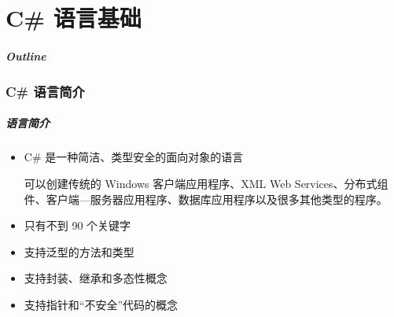 
\part{C\# 语言基础}

\begin{frame}
\frametitle{Outline}            %
\tableofcontents
\end{frame}

\section{C\# 语言简介}

\begin{frame}
\frametitle{语言简介}

\begin{itemize}
    \setlength{\itemsep}{6pt plus 1pt}
\item C\# 是一种简洁、类型安全的面向对象的语言\par
\smallskip  \CJKindent 可以创建传统的 Windows 客户端应用程序、XML Web Services、分布式组
  件、客户端---服务器应用程序、数据库应用程序以及很多其他类型的程序。
\item 只有不到 90 个关键字
\item 支持泛型的方法和类型
\item 支持封装、继承和多态性概念
\item 支持指针和“不安全”代码的概念
\end{itemize}

\end{frame}



